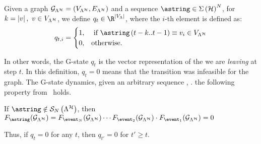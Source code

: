 \begin{definition}[G-state $q_t$]\label{def:qt}
    Given a graph $\mathcal{G}_{\Lambda^{\mathcal{H}}} = (V_{\Lambda^{\mathcal{H}}}, E_{\Lambda^{\mathcal{H}}})$ and a sequence $\astring \in \Sigma\left( \strat \right)^N$, for $k = \left|v\right|,\,\, v\in V_{\Lambda^{\mathcal{H}}}$, we define $q_t\in \R^{\abs{\VV{\Lambda}}}$, where the $i$-th element  is defined as:
    \begin{equation*}
        q_{t,i}=
        \begin{cases}
            1, &\text{ if } \astring\left(t-k..t-1\right) \equiv v_i \in \VV{\Lambda^\strat} \\
            0, &\text{otherwise}.
        \end{cases}
    \end{equation*}
\end{definition}
In other words, the G-state $q_t$ is the vector representation of the  we are \emph{leaving} at step $t$.
In this definition, $q_t=0$ means that the transition  was infeasible for the graph. The G-state dynamics, given an arbitrary sequence \removed{$\alpha$}, .
 the following property from~\cite{xu2012matrix} holds.
\begin{lemma}
    \label{cor:Fseqnotinlambda}
    If $\astring \notin \sset{N}{ \Lambda^\strat }$, then $F_{\astring} ( \GG{\Lambda^\strat} ) =
    F_{\event_N} ( \GG{\Lambda^\strat} )\cdots F_{\event_2} ( \GG{\Lambda^\strat} )\cdot F_{\event_1} ( \GG{\Lambda^\strat} ) = 0$
\end{lemma}
Thus, if $q_t=0$ for any $t$, then $q_{t'}=0$ for $t' \geq t$.
